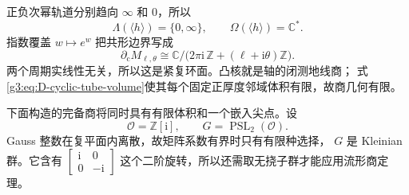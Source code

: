 \begin{example}
	正负次幂轨道分别趋向 \(\infty\) 和 \(0\)，所以
	\[
		\Lambda(\langle h\rangle)=\{0,\infty\},\qquad
		\Omega(\langle h\rangle)=\mathbb C^*.
	\]
	指数覆盖 \(w\mapsto e^w\) 把共形边界写成
	\begin{equation}\label{g3:eq:D-cyclic-conformal-torus}
		\partial_{\mathrm c}M_{\ell,\theta}
		\cong
		\mathbb C\big/
		\bigl(2\pi\mathrm i\,\mathbb Z+(\ell+\mathrm i\theta)\mathbb Z\bigr).
	\end{equation}
	两个周期实线性无关，所以这是紧复环面。凸核就是轴的闭测地线商；
	式\eqref{g3:eq:D-cyclic-tube-volume}使其每个固定正厚度邻域体积有限，故商几何有限。
\end{example}

下面构造的完备商将同时具有有限体积和一个嵌入尖点。设
\[
	\mathcal O=\mathbb Z[\mathrm i],\qquad
	G=\operatorname{PSL}_2(\mathcal O).
\]
Gauss 整数在复平面内离散，故矩阵系数有界时只有有限种选择，
\(G\) 是 Kleinian 群。它含有
\(\left[\begin{smallmatrix}\mathrm i&0\\0&-\mathrm i\end{smallmatrix}\right]\)
这个二阶旋转，所以还需取无挠子群才能应用流形商定理。


